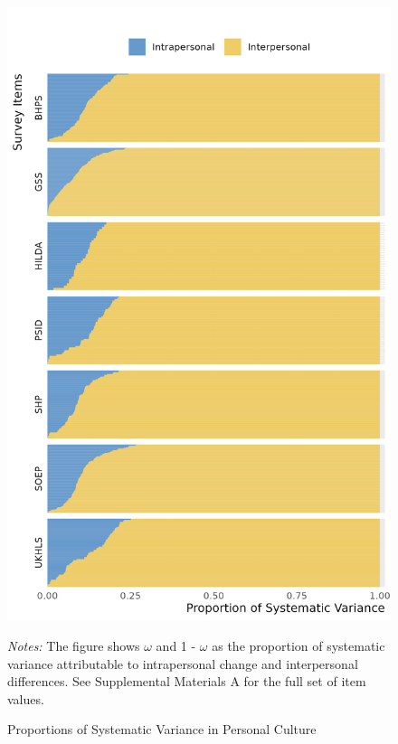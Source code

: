 \documentclass[
  12pt,
]{article}
\begin{document}
\begin{figure}[ht]
\begin{center}
\caption{Proportions of Systematic Variance in Personal Culture}

\includegraphics[width=1\linewidth]{../figures/figure_1}

\end{center}
\footnotesize{\textit{Notes:} The figure shows $\omega$ and 1 - $\omega$ as the proportion of systematic variance attributable to intrapersonal change and interpersonal differences. See Supplemental Materials A for the full set of item values.}
\end{figure}
\end{document}
